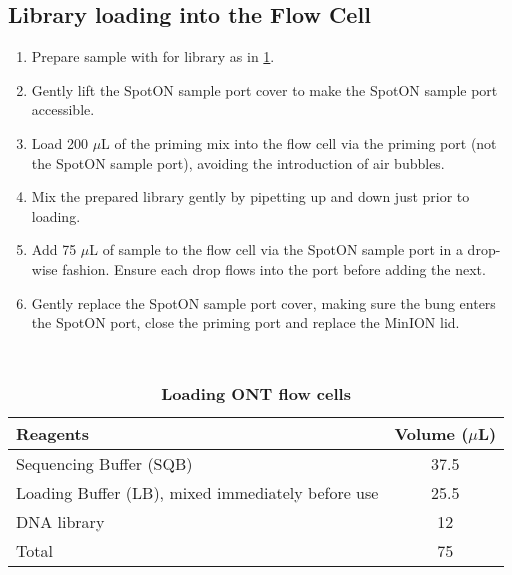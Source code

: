 \subsection{Library loading into the Flow Cell}
\begin{enumerate}
	\item Prepare sample with for library as in \cref{tab:ont_loading_flow_cells}.
	\item Gently lift the SpotON sample port cover to make the SpotON sample port accessible.
	\item Load 200 $\mu$L of the priming mix into the flow cell via the priming port (not the SpotON sample port), avoiding the introduction of air bubbles.
	\item Mix the prepared library gently by pipetting up and down just prior to loading.
	\item Add 75 $\mu$L of sample to the flow cell via the SpotON sample port in a drop-wise fashion. Ensure each drop flows into the port before adding the next.
	\item Gently replace the SpotON sample port cover, making sure the bung enters the SpotON port, close the priming port and replace the MinION lid.
\end{enumerate}
\

\begin{table}[h]
	\centering
	\caption[Loading Flow Cells]%
	{\textbf{Loading ONT flow cells}}
	\label{tab:ont_loading_flow_cells}
	\begin{tabularx}{0.8\textwidth}{lc}
		\toprule
		Reagents                                          & Volume ($\mu$L) \\ \midrule
		Sequencing Buffer (SQB)                           & 37.5        \\
		Loading Buffer (LB), mixed immediately before use & 25.5        \\
		DNA library                                       & 12          \\
		Total                                             & 75          \\ \bottomrule
	\end{tabularx}
\end{table}
\resumetocwriting